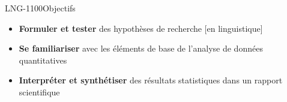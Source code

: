 \documentclass[xcolor=dvipsnames, mathserif, 10pt, aspectratio=169, handout]{beamer}
\begin{document}


\begin{frame}{LNG-1100}{Objectifs}

\begin{itemize}

	\item \textbf{Formuler et tester} des hypothèses de recherche [en linguistique]

\pause

\item \textbf{Se familiariser} avec les éléments de base de l’analyse de données quantitatives

\pause

\item \textbf{Interpréter et synthétiser} des résultats statistiques dans un rapport scientifique
\end{itemize}

\end{frame}

\end{document}
